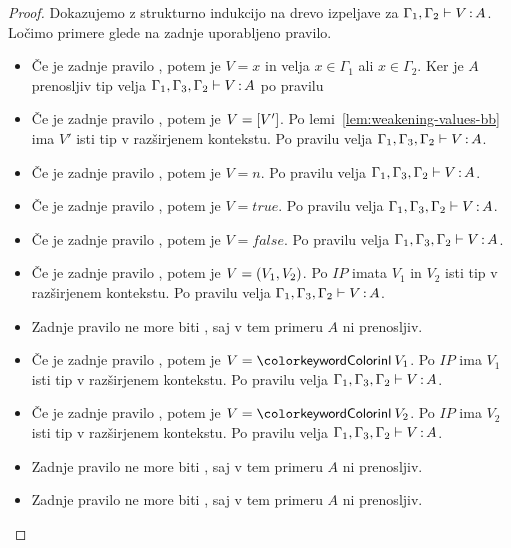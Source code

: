 \begin{proof}
	Dokazujemo z strukturno indukcijo na drevo izpeljave za $\Gamma_1, \Gamma_2 \vdash V \mathinner{:} A$.
	Ločimo primere glede na zadnje uporabljeno pravilo.
	
	\begin{itemize}
		\item Če je zadnje pravilo , potem je $V = x$ in velja $x \in \Gamma_1$ ali $x \in \Gamma_2$.
		Ker je $A$ prenosljiv tip velja $\Gamma_1, \Gamma_3, \Gamma_2 \vdash V \mathinner{:} A$ po pravilu 
		
		\item Če je zadnje pravilo , potem je $V = [V']$.
		Po lemi~\ref{lem:weakening-values-bb} ima $V'$ isti tip v razširjenem kontekstu.
		Po pravilu  velja $\Gamma_1, \Gamma_3, \Gamma_2 \vdash V \mathinner{:} A$.
		
		\item Če je zadnje pravilo , potem je $V = n$. Po pravilu  velja $\Gamma_1, \Gamma_3, \Gamma_2 \vdash V \mathinner{:} A$.
		\item Če je zadnje pravilo , potem je $V = true$. Po pravilu  velja $\Gamma_1, \Gamma_3, \Gamma_2 \vdash V \mathinner{:} A$.
		\item Če je zadnje pravilo , potem je $V = false$. Po pravilu  velja $\Gamma_1, \Gamma_3, \Gamma_2 \vdash V \mathinner{:} A$.
		
		\item Če je zadnje pravilo , potem je $V =( V_1 , V_2 )$. Po $IP$ imata $V_1$ in $V_2$ isti tip v razširjenem kontekstu.
		Po pravilu  velja $\Gamma_1, \Gamma_3, \Gamma_2 \vdash V \mathinner{:} A$.
		
		\item Zadnje pravilo ne more biti , saj v tem primeru $A$ ni prenosljiv.
		
		\item Če je zadnje pravilo , potem je $V = \tminl{V_1}$. Po $IP$ ima $V_1$ isti tip v razširjenem kontekstu.
		Po pravilu  velja $\Gamma_1, \Gamma_3, \Gamma_2 \vdash V \mathinner{:} A$.
		
		\item Če je zadnje pravilo , potem je $V = \tminl{V_2}$. Po $IP$ ima $V_2$ isti tip v razširjenem kontekstu.
		Po pravilu  velja $\Gamma_1, \Gamma_3, \Gamma_2 \vdash V \mathinner{:} A$.
		
		\item Zadnje pravilo ne more biti , saj v tem primeru $A$ ni prenosljiv.
		
		\item Zadnje pravilo ne more biti , saj v tem primeru $A$ ni prenosljiv.
		
	\end{itemize}
\end{proof}

